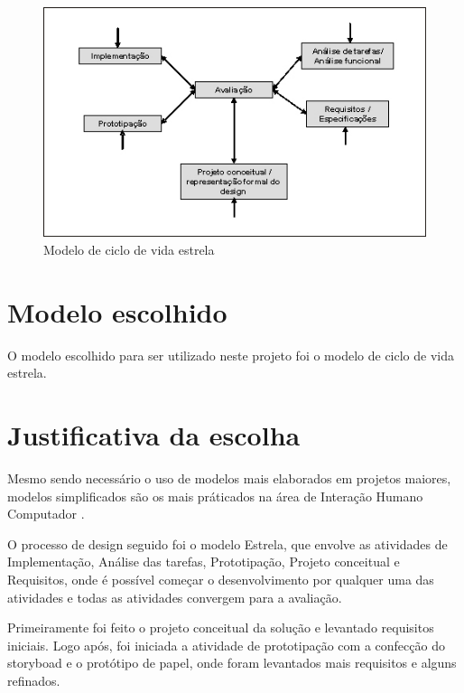\begin{figure}[!htb]
\centering
\includegraphics[scale=0.6]{figuras/estrela.jpg}
\caption{Modelo de ciclo de vida estrela}
\end{figure}
    
    \section{Modelo escolhido}
    
       O modelo escolhido para ser utilizado neste projeto foi o modelo de ciclo de vida estrela.
    
    \section{Justificativa da escolha}
    
       Mesmo sendo necessário o uso de modelos mais elaborados em projetos maiores, modelos simplificados são os mais práticados na área de Interação 
       Humano Computador \cite{ihc}.
       
       O processo de design seguido foi o modelo Estrela, que envolve as atividades de Implementação, Análise das tarefas, Prototipação, Projeto 
       conceitual e Requisitos, onde é possível começar o desenvolvimento por qualquer uma das atividades e todas as atividades convergem para 
       a avaliação. 
       
       Primeiramente foi feito o projeto conceitual da solução e levantado requisitos iniciais. Logo após, foi iniciada a atividade de prototipação com a 
       confecção do storyboad e o protótipo de papel, onde foram levantados mais requisitos e alguns refinados.
   

